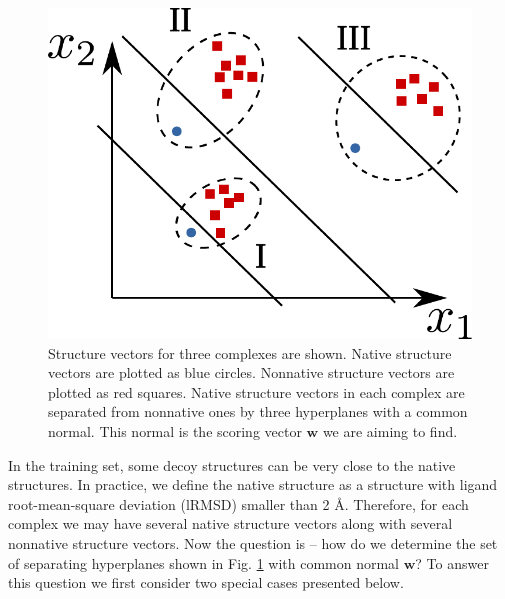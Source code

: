 \begin{figure}[H]
\begin{center}
\includegraphics[scale=0.5]{Scoring/Fig/BSVM_single_point.pdf}
\caption[Structure vectors for three complexes]{Structure vectors for three complexes are shown. Native structure vectors are plotted as blue circles. 
Nonnative structure vectors are plotted as red squares. 
Native structure vectors in each complex are separated from nonnative ones by three hyperplanes with a common normal. 
This normal is the scoring vector $\mathbf{w}$ we are aiming to find.
}
\label{fig:BSVM} 
\end{center}
\end{figure}

In the training set, some decoy structures can be very close to the native structures. In practice, we define the native structure as a structure with ligand 
root-mean-square deviation (lRMSD) smaller than 2 \AA. Therefore, for each complex we may have several  native structure vectors along with 
several nonnative structure vectors. Now the question is -- how do we determine the set of separating hyperplanes shown in  Fig. \ref{fig:BSVM} with common 
normal $\mathbf{w}$? To answer this question we first consider two special cases presented below.

